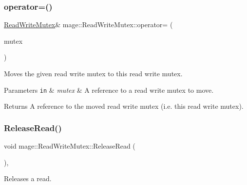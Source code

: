 \subsubsection{\texorpdfstring{operator=()}{operator=()}\hspace{0.1cm}{\footnotesize\ttfamily [2/2]}}
{\footnotesize\ttfamily \hyperlink{structmage_1_1_read_write_mutex}{Read\+Write\+Mutex}\& mage\+::\+Read\+Write\+Mutex\+::operator= (\begin{DoxyParamCaption}\item[{\hyperlink{structmage_1_1_read_write_mutex}{Read\+Write\+Mutex} \&\&}]{mutex }\end{DoxyParamCaption})\hspace{0.3cm}{\ttfamily [delete]}}

Moves the given read write mutex to this read write mutex.


\begin{DoxyParams}[1]{Parameters}
\mbox{\tt in}  & {\em mutex} & A reference to a read write mutex to move. \\
\hline
\end{DoxyParams}
\begin{DoxyReturn}{Returns}
A reference to the moved read write mutex (i.\+e. this read write mutex). 
\end{DoxyReturn}
\hypertarget{structmage_1_1_read_write_mutex_a4fbd8ad3d47e07307c31a4e212305744}{}\label{structmage_1_1_read_write_mutex_a4fbd8ad3d47e07307c31a4e212305744} 
\subsubsection{\texorpdfstring{Release\+Read()}{ReleaseRead()}}
{\footnotesize\ttfamily void mage\+::\+Read\+Write\+Mutex\+::\+Release\+Read (\begin{DoxyParamCaption}{ }\end{DoxyParamCaption})\hspace{0.3cm}{\ttfamily [private]}, {\ttfamily [noexcept]}}

Releases a read. \hypertarget{structmage_1_1_read_write_mutex_ad520a65bee5a8ac04671ee93895d9b28}{}\label{structmage_1_1_read_write_mutex_ad520a65bee5a8ac04671ee93895d9b28} 
